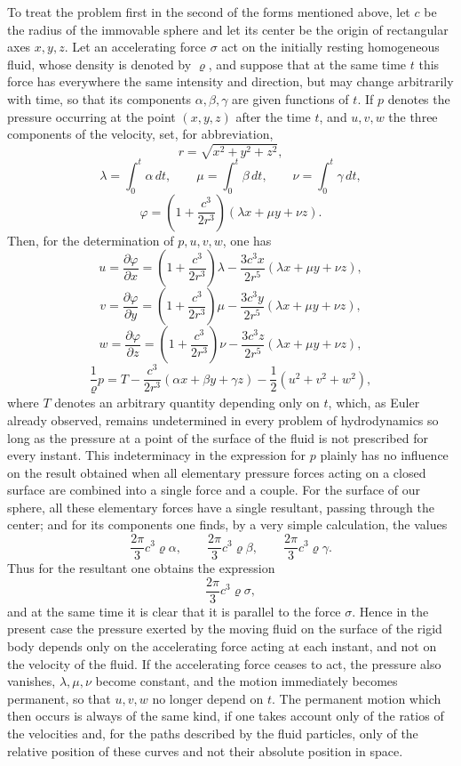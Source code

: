 \documentclass[11pt]{article}
\begin{document}
To treat the problem first in the second of the forms mentioned above, let $c$ be the radius of the immovable sphere and let its center be the origin of rectangular axes $x,y,z$. Let an accelerating force $\sigma$ act on the initially resting homogeneous fluid, whose density is denoted by $\varrho$, and suppose that at the same time $t$ this force has everywhere the same intensity and direction, but may change arbitrarily with time, so that its components $\alpha,\beta,\gamma$ are given functions of $t$. If $p$ denotes the pressure occurring at the point $(x,y,z)$ after the time $t$, and $u,v,w$ the three components of the velocity, set, for abbreviation,
\[
 r=\sqrt{x^2+y^2+z^2},
\]
\[
 \lambda=\int_0^t \alpha\,dt,\qquad
 \mu=\int_0^t \beta\,dt,\qquad
 \nu=\int_0^t \gamma\,dt,
\]
\[
 \varphi=\left(1+\frac{c^3}{2r^3}\right)(\lambda x+\mu y+\nu z).
\]
Then, for the determination of $p,u,v,w$, one has
\[
 u=\frac{\partial \varphi}{\partial x}
 =\left(1+\frac{c^3}{2r^3}\right)\lambda
 -\frac{3c^3x}{2r^5}(\lambda x+\mu y+\nu z),
\]
\[
 v=\frac{\partial \varphi}{\partial y}
 =\left(1+\frac{c^3}{2r^3}\right)\mu
 -\frac{3c^3y}{2r^5}(\lambda x+\mu y+\nu z),
\]
\[
 w=\frac{\partial \varphi}{\partial z}
 =\left(1+\frac{c^3}{2r^3}\right)\nu
 -\frac{3c^3z}{2r^5}(\lambda x+\mu y+\nu z),
\]
\[
 \frac1{\varrho}p
 =T-\frac{c^3}{2r^3}(\alpha x+\beta y+\gamma z)-\frac12(u^2+v^2+w^2),
\]
where $T$ denotes an arbitrary quantity depending only on $t$, which, as Euler already observed, remains undetermined in every problem of hydrodynamics so long as the pressure at a point of the surface of the fluid is not prescribed for every instant. This indeterminacy in the expression for $p$ plainly has no influence on the result obtained when all elementary pressure forces acting on a closed surface are combined into a single force and a couple. For the surface of our sphere, all these elementary forces have a single resultant, passing through the center; and for its components one finds, by a very simple calculation, the values
\[
 \frac{2\pi}{3}c^3\varrho\alpha,\qquad
 \frac{2\pi}{3}c^3\varrho\beta,\qquad
 \frac{2\pi}{3}c^3\varrho\gamma.
\]
Thus for the resultant one obtains the expression
\[
 \frac{2\pi}{3}c^3\varrho\sigma,
\]
and at the same time it is clear that it is parallel to the force $\sigma$. Hence in the present case the pressure exerted by the moving fluid on the surface of the rigid body depends only on the accelerating force acting at each instant, and not on the velocity of the fluid. If the accelerating force ceases to act, the pressure also vanishes, $\lambda,\mu,\nu$ become constant, and the motion immediately becomes permanent, so that $u,v,w$ no longer depend on $t$. The permanent motion which then occurs is always of the same kind, if one takes account only of the ratios of the velocities and, for the paths described by the fluid particles, only of the relative position of these curves and not their absolute position in space.
\end{document}
